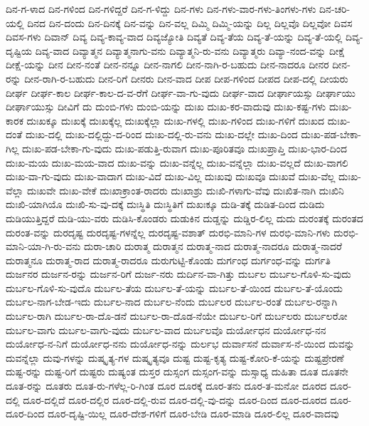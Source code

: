 {ದಿನ-ಗ-ಳಾದ
ದಿನ-ಗಳಿಂದ
ದಿನ-ಗಳಿದ್ದರೆ
ದಿನ-ಗ-ಳಿದ್ದು
ದಿನ-ಗಳು
ದಿನ-ಗಳು-ವಾರ-ಗಳು-ತಿಂಗಳು-ಗಳು
ದಿನ-ಚರಿ-ಯಲ್ಲಿ
ದಿನದ
ದಿನ-ದಂದು
ದಿನ-ದಿನಕ್ಕೆ
ದಿನ-ವನ್ನು
ದಿನ-ವಲ್ಲ
ದಿಮ್ಮಿ
ದಿಮ್ಮಿ-ಯನ್ನು
ದಿಲ್ಲ
ದಿಲ್ಲವೊ
ದಿಲ್ಲವೋ
ದಿವಸ
ದಿವಸ-ಗಳು
ದಿವಾನ್
ದಿವ್ಯ
ದಿವ್ಯ-ಕಾವ್ಯ-ವಾದ
ದಿವ್ಯಜ್ಯೋತಿ
ದಿವ್ಯತೆ
ದಿವ್ಯ-ತೆಯ
ದಿವ್ಯ-ತೆ-ಯನ್ನು
ದಿವ್ಯ-ತೆ-ಯಲ್ಲಿ
ದಿವ್ಯ-ದೃಷ್ಟಿಯ
ದಿವ್ಯ-ವಾದ
ದಿವ್ಯಾತ್ಮನ
ದಿವ್ಯಾತ್ಮನಾಗು-ವನು
ದಿವ್ಯಾತ್ಮನಿ-ರು-ವನು
ದಿವ್ಯಾತ್ಮರು
ದಿವ್ಯಾ-ನಂದ-ವನ್ನು
ದೀಕ್ಷೆ
ದೀಕ್ಷೆ-ಯನ್ನು
ದೀನ
ದೀನ-ನಂತೆ
ದೀನ-ನನ್ನೂ
ದೀನ-ನಾಗಲಿ
ದೀನ-ನಾಗಿ-ರ-ಬಹುದು
ದೀನ-ನಾದರೂ
ದೀನರ
ದೀನ-ರನ್ನು
ದೀನ-ರಾಗಿ-ರ-ಬಹುದು
ದೀನ-ರಿಗೆ
ದೀನರು
ದೀನ-ವಾದ
ದೀಪ
ದೀಪ-ಗಳಿಂದ
ದೀಪದ
ದೀಪ-ದಲ್ಲಿ
ದೀಯರು
ದೀರ್ಘ
ದೀರ್ಘ-ಕಾಲ
ದೀರ್ಘ-ಕಾಲ-ದ-ವ-ರೆಗೆ
ದೀರ್ಘ-ವಾ-ಗು-ವುದು
ದೀರ್ಘ-ವಾದ
ದೀರ್ಘಾಯಸ್ಸು
ದೀರ್ಘಾಯು
ದೀರ್ಘಾಯುಸ್ಸು
ದೀವಿಗೆ
ದು
ದುಂಬಿ-ಗಳು
ದುಂಬಿ-ಯನ್ನು
ದುಃಖ
ದುಃಖ-ಕರ-ವಾದುವು
ದುಃಖ-ಕಷ್ಟ-ಗಳು
ದುಃಖ-ಕಾರಕ
ದುಃಖಕ್ಕೂ
ದುಃಖಕ್ಕೆ
ದುಃಖಕ್ಕೆಲ್ಲ
ದುಃಖಕ್ಕೆಲ್ಲಾ
ದುಃಖ-ಗಳಲ್ಲಿ
ದುಃಖ-ಗಳಿಂದ
ದುಃಖ-ಗಳಿಗೆ
ದುಃಖದ
ದುಃಖ-ದಂತೆ
ದುಃಖ-ದಲ್ಲಿ
ದುಃಖ-ದಲ್ಲಿದ್ದು-ದ-ರಿಂದ
ದುಃಖ-ದಲ್ಲಿ-ರು-ವನು
ದುಃಖ-ದಲ್ಲೇ
ದುಃಖ-ದಿಂದ
ದುಃಖ-ಪಡ-ಬೇಕಾ-ಗಿಲ್ಲ
ದುಃಖ-ಪಡ-ಬೇಕಾ-ಗು-ವುದು
ದುಃಖ-ಪಡುತ್ತಿ-ರುವಾಗ
ದುಃಖ-ಪೂರಿತವೂ
ದುಃಖಪ್ರಾಪ್ತಿ
ದುಃಖ-ಭಾರ-ದಿಂದ
ದುಃಖ-ಮಯ
ದುಃಖ-ಮಯ-ವಾದ
ದುಃಖ-ವನ್ನು
ದುಃಖ-ವನ್ನೆಲ್ಲ
ದುಃಖ-ವನ್ನೆಲ್ಲಾ
ದುಃಖ-ವಲ್ಲದೆ
ದುಃಖ-ವಾಗಲಿ
ದುಃಖ-ವಾ-ಗು-ವುದು
ದುಃಖ-ವಾದಾಗ
ದುಃಖ-ವಿದೆ
ದುಃಖ-ವಿಲ್ಲ
ದುಃಖವು
ದುಃಖವೂ
ದುಃಖವೆ
ದುಃಖ-ವೆಲ್ಲ
ದುಃಖ-ವೆಲ್ಲಾ
ದುಃಖವೇ
ದುಃಖ-ವೇಕೆ
ದುಃಖಾಕ್ರಾಂತ-ರಾದರು
ದುಃಖಾಶ್ರು
ದುಃಖಿ-ಗಳಾಗು-ವೆವು
ದುಃಖಿತ-ನಾಗಿ
ದುಃಖಿನಿ
ದುಃಖಿ-ಯಾಗಿಯೊ
ದುಃಖಿ-ಸು-ವು-ದಕ್ಕೆ
ದುಃಸ್ಥಿತಿ
ದುಃಸ್ಥಿತಿಗೆ
ದುಖಃಕ್ಕೂ
ದುಡಿ-ತಕ್ಕೆ
ದುಡಿತ-ದಿಂದ
ದುಡಿದು
ದುಡಿಯುತ್ತಿದ್ದರೆ
ದುಡಿ-ಯು-ವರು
ದುಡಿಸಿ-ಕೊಂಡರು
ದುಡುಕಿನ
ದುಡ್ಡನ್ನು
ದುಡ್ಡಿರ-ಲಿಲ್ಲ
ದುದು
ದುರಂತಕ್ಕೆ
ದುರಂತದ
ದುರಂತ-ವನ್ನು
ದುರದೃಷ್ಟ
ದುರದೃಷ್ಟ-ಗಳನ್ನೆಲ್ಲ
ದುರದೃಷ್ಟ-ವಶಾತ್
ದುರಭಿ-ಮಾನಿ-ಗಳ
ದುರಭಿ-ಮಾನಿ-ಗಳು
ದುರಭಿ-ಮಾನಿ-ಯಾ-ಗಿ-ರು-ವನು
ದುರಾ-ಚಾರಿ
ದುರಾತ್ಮ
ದುರಾತ್ಮನ
ದುರಾತ್ಮ-ನಾದ
ದುರಾತ್ಮ-ನಾದರೂ
ದುರಾತ್ಮ-ನಾದರೆ
ದುರಾತ್ಮನೂ
ದುರಾತ್ಮ-ರಾದ
ದುರಾತ್ಮ-ರಾದರೂ
ದುರುಗುಟ್ಟಿ-ಕೊಂಡು
ದುರ್ಗಂಧ
ದುರ್ಗಂಧ-ವನ್ನು
ದುರ್ಗತಿ
ದುರ್ಜನರ
ದುರ್ಜನ-ರನ್ನು
ದುರ್ಜನ-ರಿಗೆ
ದುರ್ಜ-ನರು
ದುರ್ದಿನ-ವಾ-ಗಿತ್ತು
ದುರ್ಬಲ
ದುರ್ಬಲ-ಗೊಳಿ-ಸು-ವುದು
ದುರ್ಬಲ-ಗೊಳಿ-ಸು-ವುದೊ
ದುರ್ಬಲ-ತೆಯ
ದುರ್ಬಲ-ತೆ-ಯನ್ನು
ದುರ್ಬಲ-ತೆ-ಯಿಂದ
ದುರ್ಬಲ-ತೆ-ಯೊಂದು
ದುರ್ಬಲ-ನಾಗ-ಬೇಡ-ಇದು
ದುರ್ಬಲ-ನಾದ
ದುರ್ಬಲ-ನೆಂದು
ದುರ್ಬಲರ
ದುರ್ಬಲ-ರಂತೆ
ದುರ್ಬಲ-ರನ್ನಾಗಿ
ದುರ್ಬಲ-ರಾಗಿ
ದುರ್ಬಲ-ರಾ-ದೊ-ಡನೆ
ದುರ್ಬಲ-ರಾ-ದೊಡ-ನೆಯೇ
ದುರ್ಬಲ-ರಿಗೆ
ದುರ್ಬಲರು
ದುರ್ಬಲರೋ
ದುರ್ಬಲ-ವಾಗು
ದುರ್ಬಲ-ವಾಗು-ವುದು
ದುರ್ಬಲ-ವಾದ
ದುರ್ಬಲವೊ
ದುರ್ಯೋಧನ
ದುರ್ಯೋಧ-ನನ
ದುರ್ಯೋಧ-ನ-ನಿಗೆ
ದುರ್ಯೋಧ-ನನು
ದುರ್ಯೋಧ-ನನ್ನು
ದುರ್ಲಭ
ದುರ್ವಾಸನೆ
ದುರ್ವಾಸ-ನೆ-ಯಿಂದ
ದುವನ್ನು
ದುವನ್ನೆಲ್ಲಾ
ದುವು-ಗಳನ್ನು
ದುಷ್ಕೃತ್ಯ-ಗಳ
ದುಷ್ಕೃತ್ಯವೂ
ದುಷ್ಟ
ದುಷ್ಟ-ಕೃತ್ಯ
ದುಷ್ಟ-ಕೋರಿ-ಕೆ-ಯನ್ನು
ದುಷ್ಟಪ್ರೇರಣೆ
ದುಷ್ಟ-ರನ್ನು
ದುಷ್ಟ-ರಿಗೆ
ದುಷ್ಟರು
ದುಷ್ಯಂತ
ದುಸ್ತರ
ದುಸ್ಸಂಗ
ದುಸ್ಸಂಗ-ವನ್ನು
ದುಸ್ಸಾಧ್ಯ
ದುಹಿತಾ
ದೂತ
ದೂತನೇ
ದೂತ-ರನ್ನು
ದೂತರು
ದೂತ-ರು-ಗಳೆಲ್ಲ-ರಿ-ಗಿಂತ
ದೂರ
ದೂರಕ್ಕೆ
ದೂರ-ತನು
ದೂರ-ತ-ಮನೋ
ದೂರದ
ದೂರ-ದಲ್ಲಿ
ದೂರ-ದಲ್ಲಿದೆ
ದೂರ-ದಲ್ಲಿರ
ದೂರ-ದಲ್ಲಿ-ರುವ
ದೂರ-ದಲ್ಲಿ-ವು-ದನ್ನು
ದೂರ-ದಿಂದ
ದೂರ-ದೂರದ
ದೂರ-ದೂರ-ದಿಂದ
ದೂರ-ದೃಷ್ಟಿ-ಯಿಲ್ಲ
ದೂರ-ದೇಶ-ಗಳಿಗೆ
ದೂರ-ಬೇಡಿ
ದೂರ-ಮಾಡಿ
ದೂರ-ಲಿಲ್ಲ
ದೂರ-ವಾದವು
}
